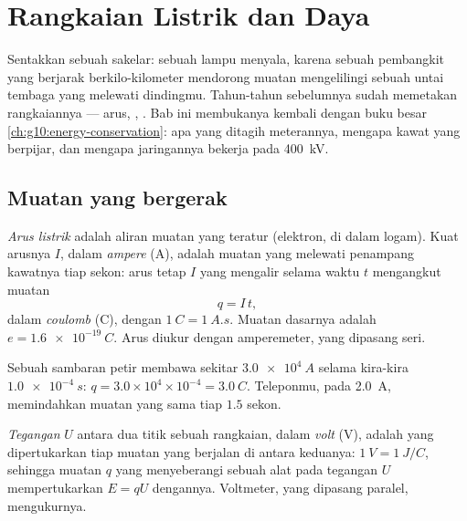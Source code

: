 \chapter{Rangkaian Listrik dan Daya}\label{ch:g11:circuits-and-power}

Sentakkan sebuah sakelar: sebuah lampu menyala, karena sebuah pembangkit
yang berjarak berkilo-kilometer mendorong muatan mengelilingi sebuah
untai tembaga yang melewati dindingmu. Tahun-tahun sebelumnya sudah
memetakan rangkaiannya --- arus, , . Bab ini
membukanya kembali dengan buku besar
\cref{ch:g10:energy-conservation}: apa yang ditagih meterannya, mengapa
kawat yang  berpijar, dan mengapa jaringannya bekerja pada
\qty{400}{kV}.

\section{Muatan yang bergerak}

\begin{definition}\label{def:g11:circuits-and-power:current}
\emph{Arus listrik} adalah aliran muatan yang
teratur (elektron, di dalam logam). Kuat arusnya $I$, dalam
\emph{ampere} (\unit{A}), adalah muatan yang melewati
penampang kawatnya tiap sekon: arus tetap $I$ yang mengalir selama
waktu $t$ mengangkut muatan
\[ q = I\,t , \]
dalam \emph{coulomb} (\unit{C}), dengan $\qty{1}{C} =
\qty{1}{A.s}$. Muatan dasarnya adalah $e = \qty{1.6e-19}{C}$. Arus
diukur dengan amperemeter, yang dipasang seri.
\end{definition}

\begin{example}\label{ex:g11:circuits-and-power:coulomb}
Sebuah sambaran petir membawa sekitar $\qty{3.0e4}{A}$ selama kira-kira
$\qty{1.0e-4}{s}$:
$q = 3.0\times10^{4} \times 10^{-4} = \qty{3.0}{C}$. Teleponmu, pada
\qty{2.0}{A}, memindahkan muatan yang sama tiap $1.5$ sekon.
\end{example}

\begin{definition}\label{def:g11:circuits-and-power:voltage}
\emph{Tegangan} $U$ antara dua titik sebuah rangkaian,
dalam \emph{volt} (\unit{V}), adalah  yang
dipertukarkan tiap  muatan yang berjalan di antara keduanya:
$\qty{1}{V} = \qty{1}{J/C}$, sehingga muatan $q$ yang menyeberangi
sebuah alat pada tegangan $U$ mempertukarkan  $E = qU$ dengannya.
Voltmeter, yang dipasang paralel, mengukurnya.
\end{definition}

